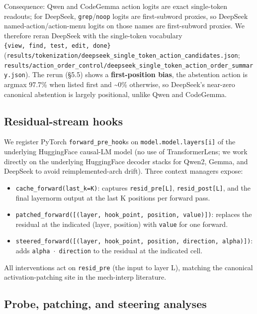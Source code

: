 \documentclass[
  11pt,
  a4paper]{article}
\providecommand{\tightlist}{%
  \setlength{\itemsep}{0pt}\setlength{\parskip}{0pt}}
\begin{document}
Consequence: Qwen and CodeGemma action logits are exact single-token
readouts; for DeepSeek, \texttt{grep}/\texttt{noop} logits are
first-subword proxies, so DeepSeek named-action/action-menu logits on
those names are first-subword proxies. We therefore reran DeepSeek with
the single-token vocabulary
\texttt{\{view,\ find,\ test,\ edit,\ done\}}
(\texttt{results/tokenization/deepseek\_single\_token\_action\_candidates.json};
\texttt{results/action\_order\_control/deepseek\_single\_token\_action\_order\_summary.json}).
The rerun (\S{}5.5) shows a \textbf{first-position bias}, the abstention
action is argmax 97.7\% when listed first and \textasciitilde0\%
otherwise, so DeepSeek's near-zero canonical abstention is largely
positional, unlike Qwen and CodeGemma.

\subsection{Residual-stream hooks}\label{residual-stream-hooks}

We register PyTorch \texttt{forward\_pre\_hook}s on
\texttt{model.model.layers{[}i{]}} of the underlying HuggingFace
causal-LM model (no use of TransformerLens; we work directly on the
underlying HuggingFace decoder stacks for Qwen2, Gemma, and DeepSeek to
avoid reimplemented-arch drift). Three context managers expose:

\begin{itemize}
\tightlist
\item
  \texttt{cache\_forward(last\_k=K)}: captures
  \texttt{resid\_pre{[}L{]}}, \texttt{resid\_post{[}L{]}}, and the final
  layernorm output at the last K positions per forward pass.
\item
  \texttt{patched\_forward({[}(layer,\ hook\_point,\ position,\ value){]})}:
  replaces the residual at the indicated (layer, position) with
  \texttt{value} for one forward.
\item
  \texttt{steered\_forward({[}(layer,\ hook\_point,\ position,\ direction,\ alpha){]})}:
  adds \texttt{alpha\ \ensuremath{\cdot}\ direction} to the residual at the indicated
  cell.
\end{itemize}

All interventions act on \texttt{resid\_pre} (the input to layer L),
matching the canonical activation-patching site in the mech-interp
literature.

\subsection{Probe, patching, and steering
analyses}\label{probe-patching-and-steering-analyses}
\end{document}
